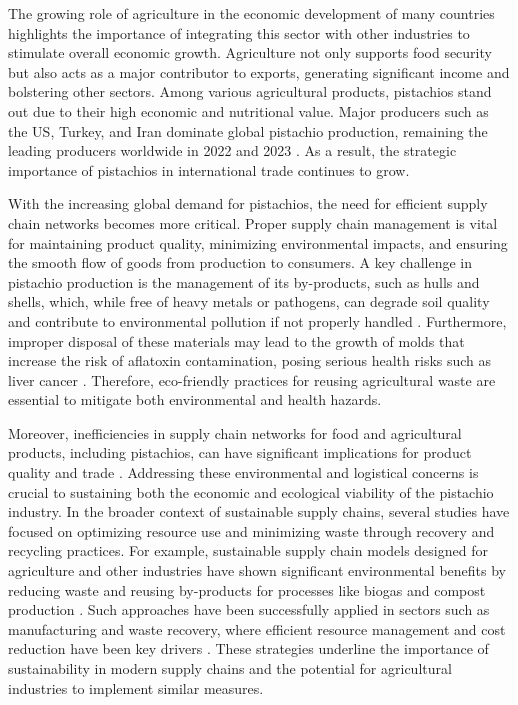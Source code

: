 \documentclass[sn-nature]{sn-jnl}%
\theoremstyle{thmstyleone}%
\theoremstyle{thmstyletwo}%
\theoremstyle{thmstylethree}%
\begin{document}
The growing role of agriculture in the economic development of many countries highlights the importance of integrating this sector with 
other industries to stimulate overall economic growth. Agriculture not only supports food security but also acts as a major contributor 
to exports, generating significant income and bolstering other sectors. Among various agricultural products, pistachios stand out due to 
their high economic and nutritional value. Major producers such as the US, Turkey, and Iran dominate global pistachio production, remaining the leading producers worldwide in 2022 and 2023 \cite{statista2023pistachio}. As a result, the strategic importance of pistachios in international trade continues to grow.

With the increasing global demand for pistachios, the need for efficient supply chain networks becomes more critical. Proper supply chain 
management is vital for maintaining product quality, minimizing environmental impacts, and ensuring the smooth flow of goods from production 
to consumers. A key challenge in pistachio production is the management of its by-products, such as hulls and shells, which, while free of heavy 
metals or pathogens, can degrade soil quality and contribute to environmental pollution if not properly handled \cite{doula2014turning, bartzas2017life}. 
Furthermore, improper disposal of these materials may lead to the growth of molds that increase the risk of aflatoxin contamination, posing serious 
health risks such as liver cancer \cite{hokmabadi2018, dronavalli2019}. Therefore, eco-friendly practices for reusing agricultural waste are 
essential to mitigate both environmental and health hazards.

Moreover, inefficiencies in supply chain networks for food and agricultural products, including pistachios, can have significant 
implications for product quality and trade \cite{casper2018reverse}. Addressing these environmental and logistical concerns is crucial to sustaining both 
the economic and ecological viability of the pistachio industry.  In the broader context of sustainable supply chains, several studies have focused on 
optimizing resource use and minimizing waste through recovery and recycling practices. For example, sustainable supply chain models designed for 
agriculture and other industries have shown significant environmental benefits by reducing waste and reusing by-products for processes like 
biogas and compost production \cite{cheraghalipour2022bi}. Such approaches have been successfully applied in sectors such as manufacturing 
and waste recovery, where efficient resource management and cost reduction have been key drivers \cite{devika2014designing, zohal2016developing}. 
These strategies underline the importance of sustainability in modern supply chains and the potential for agricultural industries to implement similar measures.
\end{document}

